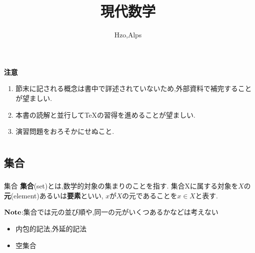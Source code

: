 \documentclass[dvipdfmx,b4j]{jsarticle}
\begin{document}
\title{現代数学}
\author{Hzo,Alps}

\maketitle
\begin{framed}
\textbf{注意}
\begin{enumerate}
    \item 節末に記される概念は書中で詳述されていないため,外部資料で補完することが望ましい.
    \item 本書の読解と並行して\TeX の習得を進めることが望ましい.
    \item 演習問題をおろそかにせぬこと.
\end{enumerate}
\end{framed}
\tableofcontents

\section{}
\subsection{集合}
\subsubsection{}
\begin{definition}{集合}{}
\textbf{集合}(set)とは,数学的対象の集まりのことを指す.
集合Xに属する対象を$X$の\textbf{元}(element)あるいは\textbf{要素}といい,
$x$が$X$の元であることを$x\in X$と表す.
\end{definition}
\noindent $\bf{Note}$:集合では元の並び順や,同一の元がいくつあるかなどは考えない
\begin{itemize}
\item 内包的記法,外延的記法
\item 空集合
\end{itemize}
\end{document}
